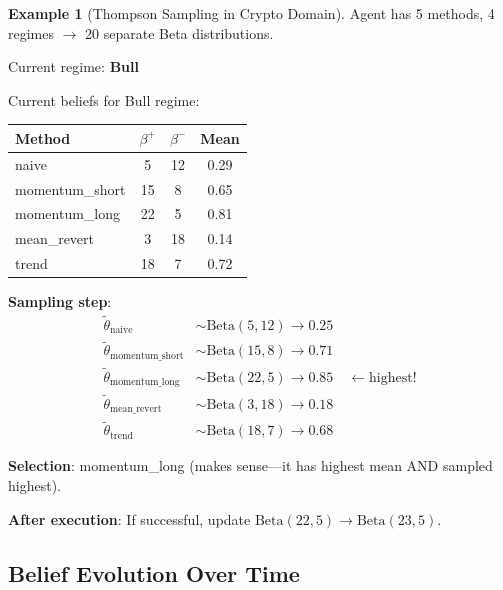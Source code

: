 \documentclass[11pt,a4paper]{article}
\theoremstyle{definition}
\newtheorem{example}{Example}[section]
\theoremstyle{plain}
\begin{document}
\begin{example}[Thompson Sampling in Crypto Domain]
Agent has 5 methods, 4 regimes $\to$ 20 separate Beta distributions.

Current regime: \textbf{Bull}

Current beliefs for Bull regime:
\begin{center}
\begin{tabular}{lccc}
\toprule
Method & $\beta^+$ & $\beta^-$ & Mean \\
\midrule
naive & 5 & 12 & 0.29 \\
momentum\_short & 15 & 8 & 0.65 \\
momentum\_long & 22 & 5 & 0.81 \\
mean\_revert & 3 & 18 & 0.14 \\
trend & 18 & 7 & 0.72 \\
\bottomrule
\end{tabular}
\end{center}

\textbf{Sampling step}:
\begin{align}
\tilde{\theta}_{\text{naive}} &\sim \text{Beta}(5, 12) \to 0.25 \\
\tilde{\theta}_{\text{momentum\_short}} &\sim \text{Beta}(15, 8) \to 0.71 \\
\tilde{\theta}_{\text{momentum\_long}} &\sim \text{Beta}(22, 5) \to 0.85 \quad \leftarrow \text{highest!} \\
\tilde{\theta}_{\text{mean\_revert}} &\sim \text{Beta}(3, 18) \to 0.18 \\
\tilde{\theta}_{\text{trend}} &\sim \text{Beta}(18, 7) \to 0.68
\end{align}

\textbf{Selection}: momentum\_long (makes sense---it has highest mean AND sampled highest).

\textbf{After execution}: If successful, update $\text{Beta}(22, 5) \to \text{Beta}(23, 5)$.
\end{example}

\subsection{Belief Evolution Over Time}
\end{document}
